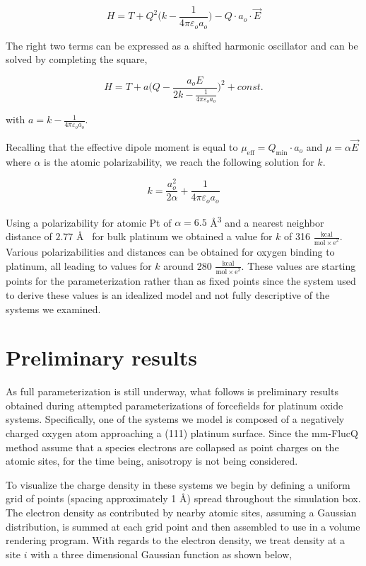 \begin{equation*}
H = T + Q^2\bigg(k - \frac{1}{4 \pi\varepsilon_o a_o}\bigg) - Q\cdot a_o \cdot \vec{E}
\end{equation*}

The right two terms can be expressed as a shifted harmonic oscillator and can be solved by completing the square,

\begin{equation*}
H = T + a\bigg(Q - \frac{a_oE}{2k - \frac{1}{4\pi\varepsilon_o a_o}}\bigg)^2 + const.
\end{equation*}

with $a = k - \frac{1}{4\pi\varepsilon_o a_o}$.

Recalling that the effective dipole moment is equal to $\mu_{\text{eff}} =
Q_{\text{min}}\cdot a_o$ and $\mu = \alpha\vec{E}$ where $\alpha$ is the atomic
polarizability, we reach the following solution for $k$.

\begin{equation*}
k = \frac{a_o^2}{2\alpha} + \frac{1}{4\pi\varepsilon_o a_o}
\end{equation*}

Using a polarizability for atomic Pt of $\alpha = 6.5$ \AA\textsuperscript{3}
and a nearest neighbor distance of $2.77$ \AA~ for bulk platinum we obtained a
value for $k$ of 316 $\frac{\text{kcal}}{\mathrm{mol\times e}^2}$. Various
polarizabilities and distances can be obtained for oxygen binding to platinum,
all leading to values for $k$ around 280 $\frac{\text{kcal}}{\mathrm{mol\times
e}^2}$.  These values are starting points for the
parameterization rather than as fixed points since the system used to derive
these values is an idealized model and not fully descriptive of the systems we
examined.

\section{Preliminary results}
As full parameterization is still underway, what follows is preliminary results
obtained during attempted parameterizations of forcefields for platinum oxide
systems. Specifically, one of the systems we model is composed of a negatively
charged oxygen atom approaching a (111) platinum surface. 
Since the mm-FlucQ method assume that a species electrons are collapsed
as point charges on the atomic sites, for the time being, anisotropy is not being considered. 

To visualize the charge density in these systems we begin by defining a uniform
grid of points (spacing approximately 1 \AA) spread throughout the simulation
box. The electron density as contributed by nearby atomic sites, assuming a
Gaussian distribution, is summed at each grid point and then assembled to use in
a volume rendering program. With regards to the electron
density, we treat density at a site $i$ with a three dimensional Gaussian
function as shown below,

